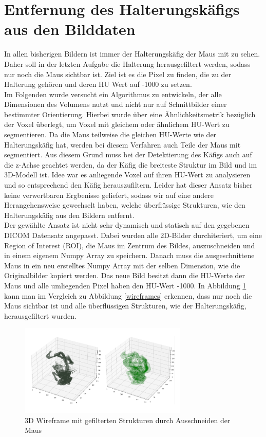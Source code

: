 \documentclass[conference]{IEEEtran}
\begin{document}
\section{Entfernung des Halterungskäfigs aus den Bilddaten}
In allen bisherigen Bildern ist immer der Halterungskäfig der Maus mit zu sehen. Daher soll in der letzten Aufgabe die Halterung herausgefiltert werden, sodass nur noch die Maus sichtbar ist. Ziel ist es die Pixel zu finden, die zu der Halterung gehören und deren HU Wert auf -1000 zu setzen. \\

Im Folgenden wurde versucht ein Algorithmus zu entwickeln, der alle Dimensionen des Volumens nutzt und nicht nur auf Schnittbilder einer bestimmter Orientierung. Hierbei wurde über eine Ähnlichkeitsmetrik bezüglich der Voxel überlegt, um Voxel mit gleichem oder ähnlichem HU-Wert zu segmentieren. Da die Maus teilweise die gleichen HU-Werte wie der Halterungskäfig hat, werden bei diesem Verfahren auch Teile der Maus mit segmentiert. Aus diesem Grund muss bei der Detektierung des Käfigs auch auf die z-Achse geachtet werden, da der Käfig die breiteste Struktur im Bild und im 3D-Modell ist.
Idee war es anliegende Voxel auf ihren HU-Wert zu analysieren und so entsprechend den Käfig herauszufiltern. Leider hat dieser Ansatz bisher keine verwertbaren Ergbenisse geliefert, sodass wir auf eine andere Herangehensweise gewechselt haben, welche überflüssige Strukturen, wie den Halterungskäfig aus den Bildern entfernt. \\

Der gewählte Ansatz ist nicht sehr dynamisch und statisch auf den gegebenen DICOM Datensatz angepasst. Dabei wurden alle 2D-Bilder durchiteriert, um eine Region of Interest (ROI), die Maus im Zentrum des Bildes, auszuschneiden und in einem eigenem Numpy Array zu speichern. 
Danach muss die ausgeschnittene Maus in ein neu erstelltes Numpy Array mit der selben Dimension, wie die Originalbilder kopiert werden. Das neue Bild besitzt dann die HU-Werte der Maus und alle umliegenden Pixel haben den HU-Wert -1000. In Abbildung \ref{wireframe_no_cage_cut} kann man im Vergleich zu Abbildung \ref{wireframes} erkennen, dass nur noch die Maus sichtbar ist und alle überflüssigen Strukturen, wie der Halterungskäfig, herausgefiltert wurden.

\begin{figure}[H]
	\begin{center}
		\includegraphics[width=8cm]{latex/images/wireframe_no_cage_cut.png}
	 	\caption{3D Wireframe mit gefilterten Strukturen durch Ausschneiden der Maus}
	 	\label{wireframe_no_cage_cut}
	\end{center}
\end{figure}
\end{document}
